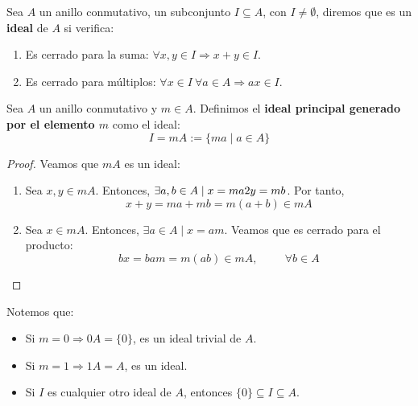 \begin{definicion}[Ideal]
    Sea $A$ un anillo conmutativo, un subconjunto $I \subseteq A$, con $I \neq \emptyset$, diremos que es un \textbf{ideal} de $A$ si verifica:
    \begin{enumerate}
        \item Es cerrado para la suma: $\forall x,y \in I \Longrightarrow x+y \in I$.
        \item Es cerrado para múltiplos: $\forall x \in I ~\forall a \in A \Longrightarrow ax \in I$.
    \end{enumerate}
\end{definicion}

\begin{teo}
    Sea $A$ un anillo conmutativo y $m \in A$. Definimos el \textbf{ideal principal generado por el elemento $m$} como el ideal:
    $$I = mA := \{ma \mid a \in A\}$$
\end{teo}
\begin{proof}
    Veamos que $mA$ es un ideal:
    \begin{enumerate}
        \item Sea $x,y\in mA$. Entonces, $\exists a,b \in A \mid x=ma 2 y=mb$. Por tanto,
        \begin{equation*}
            x+y = ma+mb = m(a+b) \in mA
        \end{equation*}

        \item Sea $x\in mA$. Entonces, $\exists a\in A\mid x=am$. Veamos que es cerrado para el producto:
        \begin{equation*}
            bx = bam = m(ab)\in mA, \hspace{1cm} \forall b\in A
        \end{equation*}
    \end{enumerate}
\end{proof}

Notemos que:
\begin{itemize}
    \item Si $m=0 \Longrightarrow 0A = \{0\}$, es un ideal trivial de $A$.
    \item Si $m=1 \Longrightarrow 1A = A$, es un ideal.
    \item Si $I$ es cualquier otro ideal de $A$, entonces $\{0\} \subseteq I \subseteq A$.
\end{itemize}

